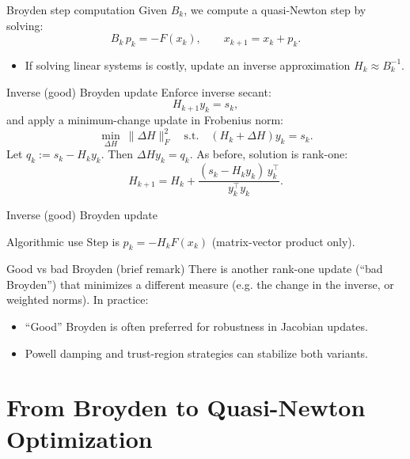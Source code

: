\documentclass[aspectratio=169]{beamer}
\begin{document}
\begin{frame}{Broyden step computation}
Given $B_k$, we compute a quasi-Newton step by solving:
\[
B_k\, p_k = -F(x_k),
\qquad x_{k+1}=x_k+p_k.
\]
\begin{itemize}
\item If solving linear systems is costly, update an inverse approximation $H_k\approx B_k^{-1}$.
\end{itemize}
\end{frame}

\begin{frame}{Inverse (good) Broyden update}
Enforce inverse secant:
\[
H_{k+1} y_k = s_k,
\]
and apply a minimum-change update in Frobenius norm:
\[
\min_{\Delta H}\ \|\Delta H\|_F^2\quad \text{s.t.}\quad (H_k+\Delta H)y_k=s_k.
\]
Let $q_k := s_k - H_k y_k$. Then $\Delta H y_k=q_k$.
As before, solution is rank-one:
\[
\boxed{
H_{k+1}=H_k + \frac{(s_k - H_k y_k)\, y_k^\top}{y_k^\top y_k}.
}
\]
\end{frame}


\begin{frame}{Inverse (good) Broyden update}

\begin{block}{Algorithmic use}
Step is $p_k=-H_k F(x_k)$ (matrix-vector product only).
\end{block}
\end{frame}




\begin{frame}{Good vs bad Broyden (brief remark)}
There is another rank-one update (``bad Broyden'') that minimizes a different measure
(e.g. the change in the inverse, or weighted norms). In practice:
\begin{itemize}
\item ``Good'' Broyden is often preferred for robustness in Jacobian updates.
\item Powell damping and trust-region strategies can stabilize both variants.
\end{itemize}
\end{frame}

\section{From Broyden to Quasi-Newton Optimization}
\end{document}
